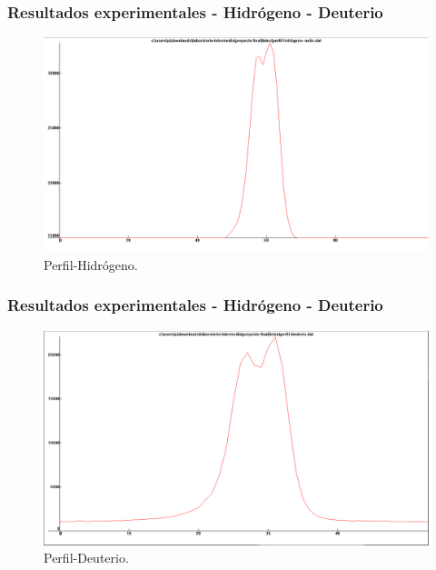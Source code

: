 \documentclass{beamer}
\begin{document}
\begin{frame}[fragile]
	\frametitle{Resultados experimentales - Hidrógeno - Deuterio}
	\begin{figure}[h!]
		\centering
		\includegraphics[width=1.\textwidth,height = 0.7\textheight]{perfil-hid}
		\caption{Perfil-Hidrógeno.}
	\end{figure}
	
\end{frame}

\begin{frame}[fragile]
	\frametitle{Resultados experimentales - Hidrógeno - Deuterio}
	\begin{figure}[h!]
		\centering
		\includegraphics[width=1.\textwidth,height = 0.7\textheight]{perfil-deu}
		\caption{Perfil-Deuterio.}
	\end{figure}
	
\end{frame}
\end{document}
